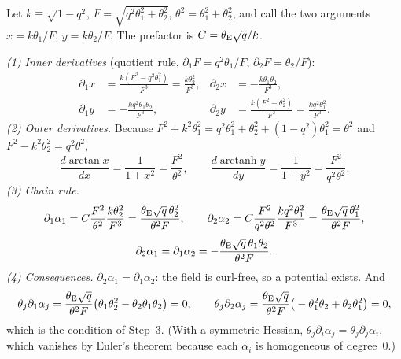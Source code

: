 \begin{derivation}
Let $k \equiv \sqrt{1-q^2}$, $F = \sqrt{q^2\theta_1^2+\theta_2^2}$,
$\theta^2 = \theta_1^2+\theta_2^2$, and call the two arguments
$x = k\theta_1/F$, $y = k\theta_2/F$.  The prefactor is
$C = \theta_{\mathrm{E}}\sqrt{q}/k$.

\textit{(1) Inner derivatives} (quotient rule, $\partial_1F = q^2\theta_1/F$,
$\partial_2F = \theta_2/F$):
\begin{align*}
  \partial_1x &= \frac{k(F^2-q^2\theta_1^2)}{F^3} = \frac{k\theta_2^2}{F^3}, &
  \partial_2x &= -\frac{k\theta_1\theta_2}{F^3},\\
  \partial_1y &= -\frac{kq^2\theta_1\theta_2}{F^3}, &
  \partial_2y &= \frac{k(F^2-\theta_2^2)}{F^3} = \frac{kq^2\theta_1^2}{F^3}.
\end{align*}
\textit{(2) Outer derivatives.}  Because
$F^2 + k^2\theta_1^2 = q^2\theta_1^2 + \theta_2^2 + (1-q^2)\theta_1^2 = \theta^2$
and $F^2 - k^2\theta_2^2 = q^2\theta^2$,
\[
  \frac{d\arctan x}{dx} = \frac{1}{1+x^2} = \frac{F^2}{\theta^2},
  \qquad
  \frac{d\operatorname{arctanh} y}{dy} = \frac{1}{1-y^2} = \frac{F^2}{q^2\theta^2}.
\]
\textit{(3) Chain rule.}
\[
  \partial_1\alpha_1 = C\frac{F^2}{\theta^2}\frac{k\theta_2^2}{F^3}
  = \frac{\theta_{\mathrm{E}}\sqrt{q}\,\theta_2^2}{\theta^2F},\qquad
  \partial_2\alpha_2 = C\frac{F^2}{q^2\theta^2}\frac{kq^2\theta_1^2}{F^3}
  = \frac{\theta_{\mathrm{E}}\sqrt{q}\,\theta_1^2}{\theta^2F},
\]
\[
  \partial_2\alpha_1 = \partial_1\alpha_2
  = -\frac{\theta_{\mathrm{E}}\sqrt{q}\,\theta_1\theta_2}{\theta^2F}.
\]
\textit{(4) Consequences.}  $\partial_2\alpha_1 = \partial_1\alpha_2$: the field
is curl-free, so a potential exists.  And
\[
  \theta_j\partial_1\alpha_j
  = \frac{\theta_{\mathrm{E}}\sqrt{q}}{\theta^2F}\big(\theta_1\theta_2^2 - \theta_2\theta_1\theta_2\big) = 0,
  \qquad
  \theta_j\partial_2\alpha_j
  = \frac{\theta_{\mathrm{E}}\sqrt{q}}{\theta^2F}\big(-\theta_1^2\theta_2 + \theta_2\theta_1^2\big) = 0,
\]
which is the condition of Step~3.  (With a symmetric Hessian,
$\theta_j\partial_i\alpha_j = \theta_j\partial_j\alpha_i$, which vanishes by
Euler's theorem because each $\alpha_i$ is homogeneous of degree~0.)
\end{derivation}


